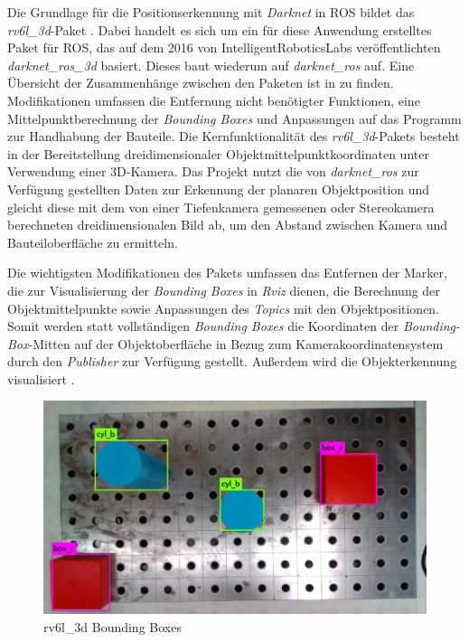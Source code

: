 Die Grundlage für die Positionserkennung mit \textit{Darknet} in \ac{ROS} bildet das \textit{rv6l\_3d}-Paket . Dabei handelt es sich um ein für diese Anwendung erstelltes Paket für \ac{ROS}, das auf dem 2016 von IntelligentRoboticsLabs veröffentlichten \textit{darknet\_ros\_3d} \cite{intelligentroboticslabs_darknet_ros_3d_2021} basiert. Dieses baut wiederum auf \textit{darknet\_ros} \cite{bjelonic_yolo_2016} auf. Eine Übersicht der Zusammenhänge zwischen den Paketen ist in  zu finden. Modifikationen umfassen die Entfernung nicht benötigter Funktionen, eine Mittelpunktberechnung der \textit{Bounding Boxes} und Anpassungen auf das Programm zur Handhabung der Bauteile. Die Kernfunktionalität des \textit{rv6l\_3d}-Pakets besteht in der Bereitstellung dreidimensionaler Objektmittelpunktkoordinaten unter Verwendung einer 3D-Kamera. Das Projekt nutzt die von \textit{darknet\_ros} zur Verfügung gestellten Daten zur Erkennung der planaren Objektposition und gleicht diese mit dem von einer Tiefenkamera gemessenen oder Stereokamera berechneten dreidimensionalen Bild ab, um den Abstand zwischen Kamera und Bauteiloberfläche zu ermitteln.

Die wichtigsten Modifikationen des Pakets umfassen das Entfernen der Marker, die zur Visualisierung der \textit{Bounding Boxes} in \textit{Rviz} dienen, die Berechnung der Objektmittelpunkte sowie Anpassungen des \textit{Topics} mit den Objektpositionen. Somit werden statt vollständigen \textit{Bounding Boxes} die Koordinaten der \textit{Bounding-Box}-Mitten auf der Objektoberfläche in Bezug zum Kamerakoordinatensystem durch den \textit{Publisher} zur Verfügung gestellt. Außerdem wird die Objekterkennung visualisiert .

\begin{figure}[ht]
    \centering
    \includegraphics[width=\textwidth]{Bilder/rv6l_boxes.jpg}
    \caption{rv6l\_3d Bounding Boxes}
    \label{fig:rv6l_boxes}
\end{figure}

